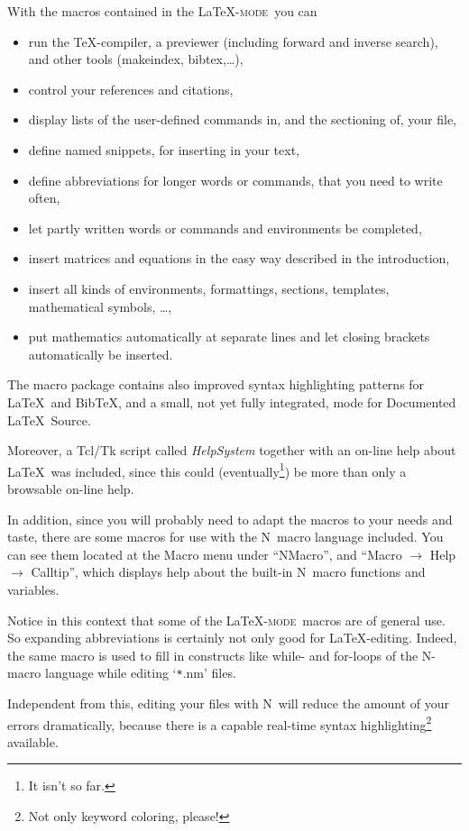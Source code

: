 \documentclass{article}
\newcommand{\latexpack}{\LaTeX-\textsc{mode}}
\newcommand{\nedit}{N\kern-0.8pt{Edit}}
\newcommand{\menu}[1]{``#1''}
\begin{document}
With the macros contained in the \latexpack\ you can
\begin{itemize}
\item run the \TeX-compiler, a previewer (including forward and inverse search), and other tools (makeindex, bibtex,\dots),
\item control your references and citations,
\item display lists of the user-defined commands in, and the sectioning of, your file,
\item define named snippets, for inserting in your text,
\item define abbreviations for longer words or commands, that you need to write often,
\item let partly written words or commands and environments be completed,
\item insert matrices and equations in the easy way described in the introduction,
\item insert all kinds of environments, formattings, sections, templates, mathematical symbols, \ldots,
\item put mathematics automatically at separate lines and let closing brackets automatically be inserted.
\end{itemize}

The macro package contains also improved syntax highlighting patterns for \LaTeX\ and Bib\TeX, and a small, not yet fully integrated, mode for Documented \LaTeX\ Source.

Moreover, a Tcl/Tk script called \emph{HelpSystem} together with an on-line help about \LaTeX\ was included, since this could (eventually\footnote{It isn't so far.}) be more than only a browsable on-line help.

In addition, since you will probably need to adapt the macros to your needs and taste, there are some macros for use with the \nedit\ macro language included. You can see them located at the Macro menu under \menu{NMacro}, and \menu{Macro $\to$ Help $\to$ Calltip}, which displays help about the built-in \nedit\ macro functions and variables.

Notice in this context that some of the \latexpack\ macros are of general use. So expanding abbreviations is certainly not only good for \LaTeX-editing. Indeed, the same macro is used to fill in constructs like while- and for-loops of the \nedit-macro language while editing `\verb|*|.nm' files.

Independent from this, editing your files with \nedit\ will reduce the amount of your errors dramatically, because there is a capable real-time syntax highlighting\footnote{Not only keyword coloring, please!} available.
\end{document}
